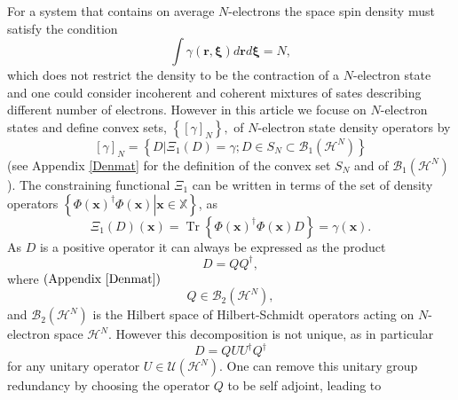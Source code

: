 \documentclass[aps,preprint]{revtex4}%
\begin{document}
For a system that contains on average $N$-electrons the space spin density
must satisfy the condition
\begin{equation}
\int\gamma\left(  \boldsymbol{r,\xi}\right)  d\boldsymbol{r}d\boldsymbol{\xi
}=N, \label{Number}%
\end{equation}
which does not restrict the density to be the contraction of a $N$-electron
state and one could consider incoherent and coherent mixtures of sates
describing different number of electrons. However in this article we focuse on
$N$-electron states and define convex sets, $\left\{  \left[  \gamma\right]
_{N}\right\}  ,$ of $N$-electron state density operators by
\begin{equation}
\left[  \gamma\right]  _{N}=\left\{  \left.  D\right\vert \Xi_{1}\left(
D\right)  =\gamma;D\in S_{N}\subset\mathcal{B}_{1}\left(  \mathcal{H}%
^{N}\right)  \right\}
\end{equation}
(see Appendix \ref{Denmat} for the definition of the convex set $S_{N}$ and of
$\mathcal{B}_{1}\left(  \mathcal{H}^{N}\right)  $). The constraining
functional $\Xi_{1}$ can be written in terms of the set of density operators
$\left\{  \left.  \Phi\left(  \boldsymbol{x}\right)  ^{\dagger}\Phi\left(
\boldsymbol{x}\right)  \right\vert \boldsymbol{x\in}\mathbb{X}\right\}  $, as
\begin{equation}
\Xi_{1}\left(  D\right)  \left(  \boldsymbol{x}\right)  =\operatorname{Tr}%
\left\{  \Phi\left(  \boldsymbol{x}\right)  ^{\dagger}\Phi\left(
\boldsymbol{x}\right)  D\right\}  =\gamma\left(  \boldsymbol{x}\right)  .
\end{equation}
As $D$ is a positive operator it can always be expressed as the product
\begin{equation}
D=QQ^{\dagger},
\end{equation}
where $\left(  \text{Appendix \ref{Denmat}}\right)  $
\begin{equation}
Q\in\mathcal{B}_{2}\left(  \mathcal{H}^{N}\right)  ,
\end{equation}
and $\mathcal{B}_{2}\left(  \mathcal{H}^{N}\right)  $ is the Hilbert space of
Hilbert-Schmidt operators acting on $N$-electron space $\mathcal{H}^{N}$.
However this decomposition is not unique, as in particular
\begin{equation}
D=QUU^{\dagger}Q^{\dagger}%
\end{equation}
for any unitary operator $U\in\mathcal{U}\left(  \mathcal{H}^{N}\right)  $.
One can remove this unitary group redundancy by choosing the operator $Q$ to
be self adjoint, leading to
\end{document}
